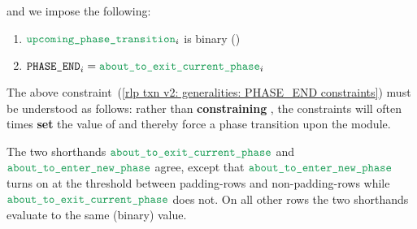 and we impose the following:
\begin{enumerate}
    \item
        $\locValidPhaseTransition _{i}$ is binary \quad (\sanityCheck)
    \item \label{rlp txn v2: generalities: PHASE_END constraints}
        $\phaseEnd_{i} = \locAboutToExitPhase _{i}$
\end{enumerate}
\saNote{}
The above constraint~(\ref{rlp txn v2: generalities: PHASE_END constraints})
must be understood as follows: rather than \textbf{constraining} \phaseEnd{},
the constraints will often times \textbf{set} the value of \phaseEnd{} and thereby force a phase transition upon the module.

\saNote{}
The two shorthands $\locAboutToExitPhase$ and $\locAboutToEnterNewPhase$
agree, except that $\locAboutToEnterNewPhase$ turns on at the threshold between
padding-rows and non-padding-rows while $\locAboutToExitPhase$ does not.
On all other rows the two shorthands evaluate to the same (binary) value.
